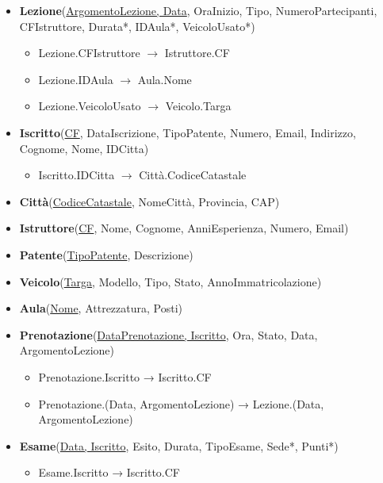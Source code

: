 \documentclass[10pt,twoside]{article}
\begin{document}
{{        \begin{itemize}
            \item \textbf{Lezione}(\underline{ArgomentoLezione, Data}, OraInizio, Tipo, NumeroPartecipanti, CFIstruttore, Durata*, IDAula*, VeicoloUsato*)
            \begin{itemize}
                \item Lezione.CFIstruttore  $\rightarrow$ Istruttore.CF
                \item Lezione.IDAula  $\rightarrow$ Aula.Nome
                \item Lezione.VeicoloUsato $\rightarrow$ Veicolo.Targa
            \end{itemize}
            \item \textbf{Iscritto}(\underline{CF}, DataIscrizione, TipoPatente, Numero, Email, Indirizzo, Cognome, Nome, IDCitta)
            \begin{itemize}
                \item Iscritto.IDCitta $\rightarrow$ Città.CodiceCatastale
            \end{itemize}
            \item \textbf{Città}(\underline{CodiceCatastale}, NomeCittà, Provincia, CAP)
            \item \textbf{Istruttore}(\underline{CF}, Nome, Cognome, AnniEsperienza, Numero, Email)
            \item \textbf{Patente}(\underline{TipoPatente}, Descrizione)
            \item \textbf{Veicolo}(\underline{Targa}, Modello, Tipo, Stato, AnnoImmatricolazione)
            \item \textbf{Aula}(\underline{Nome}, Attrezzatura, Posti)
            \item \textbf{Prenotazione}(\underline{DataPrenotazione, Iscritto}, Ora, Stato, Data, ArgomentoLezione)
            \begin{itemize}
                \item Prenotazione.Iscritto → Iscritto.CF
                \item Prenotazione.(Data, ArgomentoLezione) → Lezione.(Data, ArgomentoLezione)
            \end{itemize}
            \item \textbf{Esame}(\underline{Data, Iscritto}, Esito, Durata, TipoEsame, Sede*, Punti*)
            \begin{itemize}
                \item Esame.Iscritto → Iscritto.CF
            \end{itemize}

\end{itemize}}}
\end{document}
